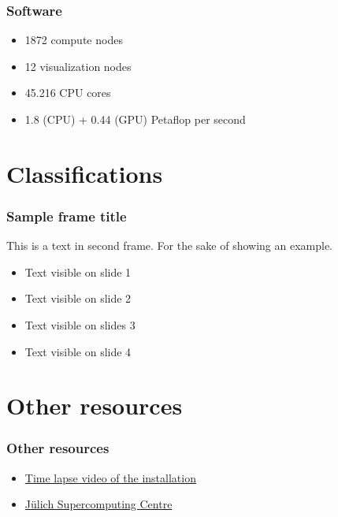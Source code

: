 \documentclass{beamer}
\begin{document}
\begin{frame}
  \frametitle{Software}
  \begin{itemize}
    \item 1872 compute nodes
    \item 12 visualization nodes
    \item 45.216 CPU cores
    \item 1.8 (CPU) + 0.44 (GPU) Petaflop per second
  \end{itemize}
\end{frame}


\section{Classifications}

\begin{frame}
  \frametitle{Sample frame title}
  This is a text in second frame. For the sake of showing an example.

  \begin{itemize}
    \item<1-> Text visible on slide 1
    \item<2-> Text visible on slide 2
    \item<3> Text visible on slides 3
    \item<4-> Text visible on slide 4
  \end{itemize}
\end{frame}


\section{Other resources}

\begin{frame}
  \frametitle{Other resources}
  \begin{itemize}
    \item \href{https://www.youtube.com/watch?v=7h6mYU2HDTA}{Time lapse video of the installation}
    \item \href{https://www.fz-juelich.de/ias/jsc/EN/Home/home_node.html}{Jülich Supercomputing Centre}
  \end{itemize}
\end{frame}
\end{document}
